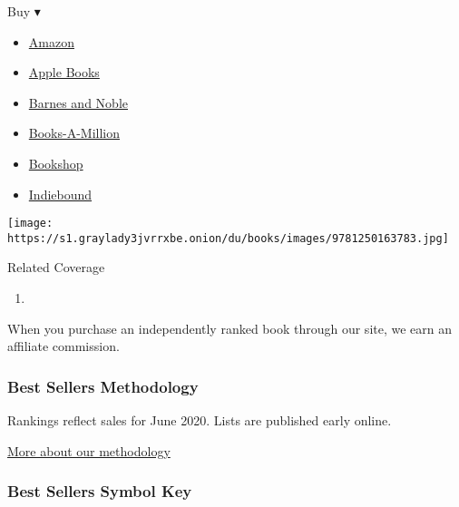 \begin{enumerate}
  Buy ▾

  \begin{itemize}
  \tightlist
  \item
    \href{https://www.amazon.com/dp/1250163781?tag=NYTBSREV-20\&tag=NYTBS-20}{Amazon}
  \item
    \href{https://du-gae-books-dot-nyt-du-prd.appspot.com/buy?title=UNITED+STATES+OF+SOCIALISM\&author=Dinesh+D\%27Souza}{Apple
    Books}
  \item
    \href{https://www.anrdoezrs.net/click-7990613-11819508?url=https\%3A\%2F\%2Fwww.barnesandnoble.com\%2Fw\%2F\%3Fean\%3D9781250752512}{Barnes
    and Noble}
  \item
    \href{https://www.anrdoezrs.net/click-7990613-35140?url=https\%3A\%2F\%2Fwww.booksamillion.com\%2Fp\%2FUNITED\%2BSTATES\%2BOF\%2BSOCIALISM\%2FDinesh\%2BD\%2527Souza\%2F9781250752512}{Books-A-Million}
  \item
    \href{https://bookshop.org/a/3546/9781250752512}{Bookshop}
  \item
    \href{https://www.indiebound.org/book/9781250752512?aff=NYT}{Indiebound}
  \end{itemize}

  \texttt{[image: https://s1.graylady3jvrrxbe.onion/du/books/images/9781250163783.jpg]}
\end{enumerate}

Related Coverage

\begin{enumerate}
\def\labelenumi{\arabic{enumi}.}
\tightlist
\item
  \href{https://www.nytimes3xbfgragh.onion/2020/07/31/books/review/the-system-robert-reich-break-em-up-zephyr-teachout.html}{}
\end{enumerate}

When you purchase an independently ranked book through our site, we earn
an affiliate commission.

\hypertarget{best-sellers-methodology}{%
\subsubsection{Best Sellers
Methodology}\label{best-sellers-methodology}}

Rankings reflect sales for June 2020. Lists are published early online.

\href{/books/best-sellers/methodology/}{More about our methodology}

\hypertarget{best-sellers-symbol-key}{%
\subsubsection{Best Sellers Symbol Key}\label{best-sellers-symbol-key}}

